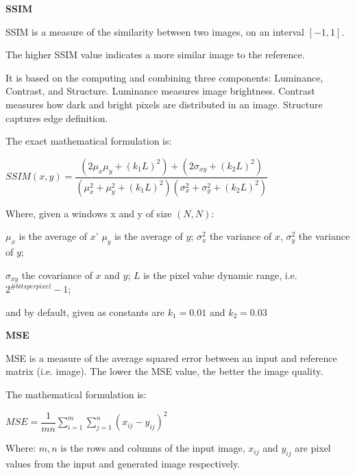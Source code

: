 \vspace{3mm}

\textbf{SSIM}


SSIM is a measure of the similarity between two images, on an interval $[-1, 1]$.

The higher SSIM value indicates a more similar image to the reference. 

It is based on the computing and combining three components: Luminance, Contrast, and Structure.
Luminance measures image brightness. Contrast measures how dark and bright pixels are distributed in an image. 
Structure captures edge definition. \citep{SSIM_bovik}
\vspace{2mm}

The exact mathematical formulation is:

\vspace{3mm}
\begin{center}
$SSIM(x,y) = \dfrac{(2\mu_x\mu_y + (k_1 L)^2) + (2 \sigma _{xy} + (k_2 L)^2)}{(\mu_x^2 + \mu_y^2+(k_1 L)^2) (\sigma_x^2 + \sigma_y^2+(k_2 L)^2)}$
\end{center}
\vspace{3mm}

Where, given a windows x and y of size $(N,N)$:

$\mu_x$ is the average of $x$'  $\mu_y$ is the average of $y$;  $\sigma _{x}^{2}$ the variance of $x$, $\sigma _{y}^{2}$ the variance of $y$;

$\sigma_{xy}$ the covariance of $x$ and $y$; $L$ is the pixel value dynamic range, i.e. $2^{\#bits per pixel}-1$;

and by default, given as constants are $k_{1}=0.01$ and $k_{2}=0.03$ \citep{SSIM_bovik}

\vspace{6mm}

\textbf{MSE}


MSE is a measure of the average squared error between an input and reference matrix (i.e. image). 
The lower the MSE value, the better the image quality.

The mathematical formulation is:

\vspace{3mm}

\begin{center}
$MSE=\dfrac{1}{mn} \sum_{i=1}^m \sum_{j=1}^n (x_{ij}-y_{ij})^2 $
\end{center}


Where:
$m,n$ is the rows and columns of the input image,
$x_{ij}$ and $y_{ij}$ are pixel values from the input and generated image respectively. \citep{Metrics}


